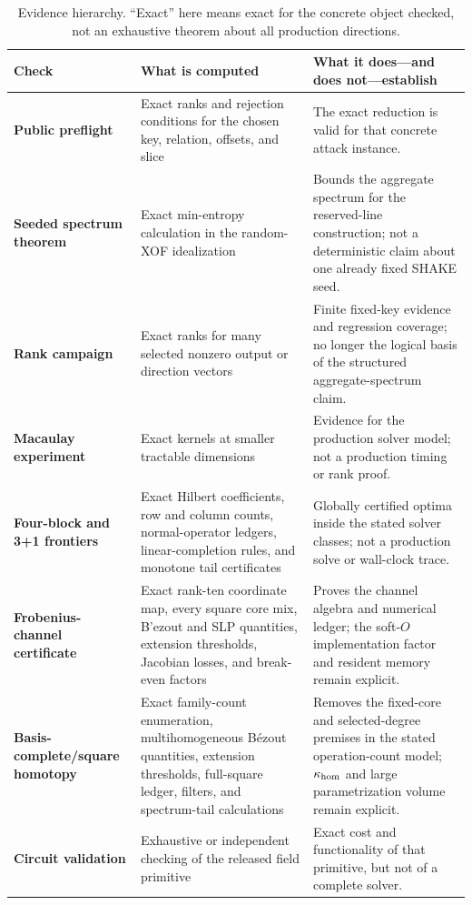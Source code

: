 \documentclass[11pt]{article}
\begin{document}
\begin{table}[H]
\centering
\caption{Evidence hierarchy.  ``Exact'' here means exact for the concrete
object checked, not an exhaustive theorem about all production directions.}
\label{tab:evidence-hierarchy}
\small
\renewcommand{\arraystretch}{1.12}
\begin{tabularx}{0.96\textwidth}{@{}>{\raggedright\arraybackslash\bfseries}p{}>{\raggedright\arraybackslash}p{}>{\raggedright\arraybackslash}X@{}}
\toprule
Check & What is computed & What it does---and does not---establish\\
\midrule
Public preflight & Exact ranks and rejection conditions for the chosen key,
relation, offsets, and slice & The exact reduction is valid for that concrete
attack instance.\\
Seeded spectrum theorem & Exact min-entropy calculation in the random-XOF
idealization & Bounds the aggregate spectrum for the reserved-line construction;
not a deterministic claim about one already fixed SHAKE seed.\\
Rank campaign & Exact ranks for many selected nonzero output or direction
vectors & Finite fixed-key evidence and regression coverage; no longer the
logical basis of the structured aggregate-spectrum claim.\\
Macaulay experiment & Exact kernels at smaller tractable dimensions & Evidence
for the production solver model; not a production timing or rank proof.\\
Four-block and 3+1 frontiers & Exact Hilbert coefficients, row and column
counts, normal-operator ledgers, linear-completion rules, and monotone tail
certificates & Globally certified optima inside the stated solver classes;
not a production solve or wall-clock trace.\\
Frobenius-channel certificate & Exact rank-ten coordinate map, every square
core mix, B'ezout and SLP quantities, extension thresholds, Jacobian losses,
and break-even factors & Proves the channel algebra and numerical ledger; the
soft-$O$ implementation factor and resident memory remain explicit.\\
Basis-complete/square homotopy & Exact family-count enumeration, multihomogeneous
B\'ezout quantities, extension thresholds, full-square ledger, filters, and
spectrum-tail calculations & Removes the fixed-core and selected-degree
premises in the stated operation-count model; $\kappa_{\rm hom}$ and large
parametrization volume remain explicit.\\
Circuit validation & Exhaustive or independent checking of the released field
primitive & Exact cost and functionality of that primitive, but not of a
complete solver.\\
\bottomrule
\end{tabularx}
\end{table}
\end{document}
